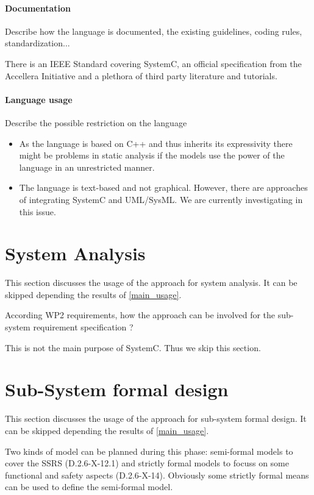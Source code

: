 \paragraph{Documentation} Describe how the language is documented, the existing guidelines, coding rules, standardization...

There is an IEEE Standard covering SystemC, an official specification from the Accellera Initiative and a plethora of third party literature and tutorials.

\paragraph{Language usage} Describe the possible restriction on the language

\begin{itemize}
\item As the language is based on C++ and thus inherits its expressivity there might be problems in static analysis if the models use the power of the language in an unrestricted manner.
\item The language is text-based and not graphical. However, there are approaches of integrating SystemC and UML/SysML. We are currently investigating in this issue.
\end{itemize}


\section{System Analysis}
This section discusses the usage of the approach for system analysis.
It can be skipped depending the results of \ref{main_usage}.

According WP2 requirements, how the approach can be involved for the sub-system requirement specification ?

\begin{author_comment}
This is not the main purpose of SystemC. Thus we skip this section.
\end{author_comment}

\section{Sub-System formal design}
This section discusses the usage of the approach for sub-system formal design.
It can be skipped depending the results of \ref{main_usage}.

Two kinds of model can be planned during this phase: semi-formal models to cover the SSRS (D.2.6-X-12.1) and strictly formal models to focuss on some functional and safety aspects (D.2.6-X-14). Obviously some strictly formal means can be used to define the semi-formal model.

